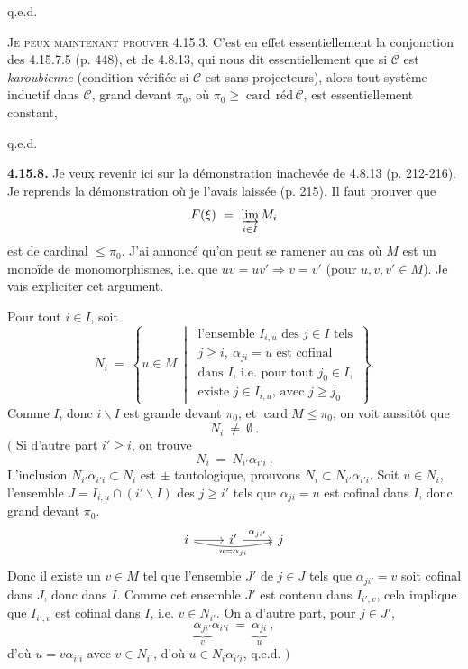 \documentclass[11pt]{article}
\newcommand{\printedpage}[1]{\marginpar{\footnotesize p.~#1}}
\newcommand{\msp}[1]{\marginpar{\footnotesize [#1]}}
\newcommand{\card}{\operatorname{card}}
\begin{document}
\hfill q.e.d.

\textsc{Je peux maintenant prouver} 4.15.3. C'est en effet essentiellement la conjonction des 4.15.7.5 (p. 448), et de 4.8.13, qui nous dit essentiellement que si $\mathcal{C}$ est \textit{karoubienne} (condition vérifiée si $\mathcal{C}$ est sans projecteurs), alors tout système inductif dans $\mathcal{C}$, grand devant $\pi_0$, où $\pi_0 \geqslant \card\,\text{réd}\,\mathcal{C}$, est essentiellement constant,

\hfill q.e.d.

\printedpage{175}

\msp{page 453}
\textbf{4.15.8.} Je veux revenir ici sur la démonstration inachevée de 4.8.13 (p. 212-216). Je reprends la démonstration où je l'avais laissée (p. 215). Il faut prouver que
\[
F(\xi) \ = \ \varinjlim_{i\in I} M_i
\]
est de cardinal $\leqslant \pi_0$. J'ai annoncé qu'on peut se ramener au cas où $M$ est un monoïde de monomorphismes, i.e. que $uv = uv' \Longrightarrow v = v'$ (pour $u,v,v' \in M$). Je vais expliciter cet argument.

Pour tout $i\in I$, soit
\[
N_i \ = \ \left\{ u \in M \ \middle| \ \begin{array}{l}
\text{l'ensemble } I_{i,u} \text{ des } j\in I \text{ tels}\\
j \geqslant i,\ \alpha_{ji} = u \text{ est cofinal}\\
\text{dans } I\text{, i.e. pour tout } j_0\in I,\\
\text{existe } j \in I_{i,u}\text{, avec } j \geqslant j_0
\end{array} \right\} .
\tag*{(4.15.8.1)}
\]
Comme $I$, donc $i\backslash I$ est grande devant $\pi_0$, et $\card M \leqslant \pi_0$, on voit aussitôt que
\[
N_i \ \neq \ \emptyset \ .
\tag*{(4.15.8.2)}
\]
$\Big($ Si d'autre part $i' \geqslant i$, on trouve
\[
N_i \ = \ N_{i'}\alpha_{i'i} \ .
\tag*{(4.15.8.3)}
\]
L'inclusion $N_{i'}\alpha_{i'i} \subset N_i$ est $\pm$ tautologique, prouvons $N_i \subset N_{i'}\alpha_{i'i}$. Soit $u \in N_i$, l'ensemble $J = I_{i,u} \cap (i'\backslash I)$ des $j \geqslant i'$ tels que $\alpha_{ji} = u$ est cofinal dans $I$, donc grand devant $\pi_0$.
\[
\begin{tikzcd}
i \arrow[r] \arrow[rr, bend right=12, "u = \alpha_{ji}"'] & i' \arrow[r, "\alpha_{ji'}"] & j
\end{tikzcd}
\]
Donc il existe un $v \in M$ tel que l'ensemble $J'$ de $j\in J$ tels que $\alpha_{ji'} = v$
\msp{page 454}
soit cofinal dans $J$, donc dans $I$. Comme cet ensemble $J'$ est contenu dans $I_{i',v}$, cela implique que $I_{i',v}$ est cofinal dans $I$, i.e. $v \in N_{i'}$. On a d'autre part, pour $j \in J'$,
\[
\underbrace{\alpha_{ji'}}_{v}\alpha_{i'i} \ = \ \underbrace{\alpha_{ji}}_{u} \ ,
\]
d'où $u = v\alpha_{i'i}$ avec $v\in N_{i'}$, d'où $u \in N_i\alpha_{i'i}$, q.e.d. $\Big)$ %
\end{document}
